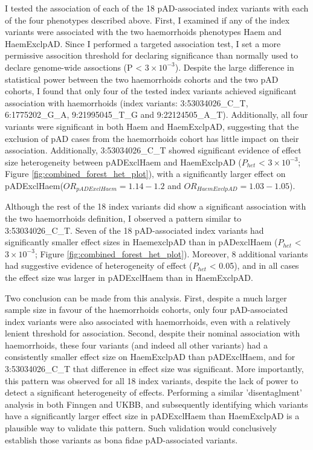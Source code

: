 I tested the association of each of the 18 pAD-associated index variants with each of the four phenotypes described above. First, I examined if any of the index variants were associated with the two haemorrhoids phenotypes Haem and HaemExclpAD. Since I performed a targeted association test, I set a more permissive assocition threshold for declaring significance than normally used to declare genome-wide assoctions (P < $3\times10^{-3}$). Despite the large difference in statistical power between the two haemorrhoids cohorts and the two pAD cohorts, I found that only four of the tested index variants achieved significant association with haemorrhoids (index variants: 3:53034026\_C\_T, 6:1775202\_G\_A, 9:21995045\_T\_G and 9:22124505\_A\_T). Additionally, all four variants were significant in both Haem and HaemExclpAD, suggesting that the exclusion of pAD cases from the haemorrhoids cohort has little impact on their association. Additionally, 3:53034026\_C\_T showed significant evidence of effect size heterogeneity between pADExclHaem and HaemExclpAD ($P_{het}$ < $3\times10^{-3}$; Figure \ref{fig:combined_forest_het_plot}), with a significantly larger effect on pADExclHaem($OR_{pADExclHaem}=1.14-1.2$ and $OR_{HaemExclpAD}=1.03-1.05$).

Although the rest of the 18 index variants did show a significant association with the two haemorrhoids definition, I observed a pattern similar to 3:53034026\_C\_T. Seven of the 18 pAD-associated index variants had significantly smaller effect sizes in HaemexclpAD than in pADexclHaem ($P_{het}$ < $3\times10^{-3}$; Figure \ref{fig:combined_forest_het_plot}). Moreover, 8 additional variants had suggestive evidence of heterogeneity of effect ($P_{het}$ < 0.05), and in all cases the effect size was larger in pADExclHaem than in HaemExclpAD. 

Two conclusion can be made from this analysis. First, despite a much larger sample size in favour of the haemorrhoids cohorts, only four pAD-associated index variants were also associated with haemorrhoids, even with a relatively lenient threshold for association. Second, despite their nominal association with haemorrhoids, these four variants (and indeed all other variants) had a consistently smaller effect size on HaemExclpAD than pADExclHaem, and for 3:53034026\_C\_T that difference in effect size was significant. More importantly, this pattern was observed for all 18 index variants, despite the lack of power to detect a significant heterogeneity of effects. Performing a similar 'disentaglment' analysis in both Finngen and UKBB, and subsequently identifying which variants have a significantly larger effect size in pADExclHaem than HaemExclpAD is a plausible way to validate this pattern. Such validation would conclusively establish those variants as bona fidae pAD-associated variants.





